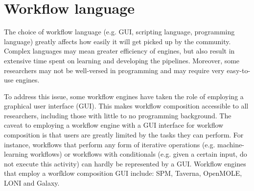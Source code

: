 \documentclass{report}
\begin{document}
        \section{Workflow language}\label{lang}
            The choice of workflow language (e.g. GUI, scripting language,
            programming language) greatly
            affects how easily it will get picked up by the community. Complex
            languages may mean greater efficiency of engines,
            but also result in extensive time spent on learning and developing
            the pipelines. Moreover, some researchers may not be well-versed in
            programming and may require very easy-to-use engines.

            To address this issue, some workflow engines have taken the role
            of employing a graphical user interface (GUI). This makes workflow 
            composition accessible to all researchers, including those with
            little to no programming background. The caveat to employing a 
            workflow engine with a GUI interface for workflow composition is
            that users are greatly limited by the tasks they can perform. For 
            instance, workflows that perform any form of iterative operations
            (e.g. machine-learning workflows) or workflows with conditionals
            (e.g. given a certain input, do not execute this activity) can hardly
            be represented by a GUI. 
            Workflow engines that employ a worfklow composition GUI include:
            SPM, Taverna, OpenMOLE, LONI and Galaxy.
\end{document}
